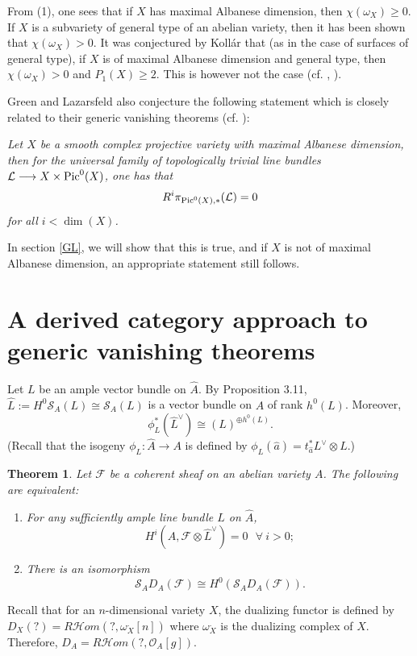 \documentclass[10pt]{amsart}
\newtheorem{thm}{Theorem}[section]
\newcommand\Pic{{\text{\rm Pic}}}
\newcommand\lra{\longrightarrow}
\newcommand\ot{{\otimes}}
\newcommand\OO{{\mathcal{O}}}
\newcommand\HH{{\mathcal{H}}}
\newcommand\PP{{\mathcal{L}}}
\newcommand\FF{{\mathcal{F}}}
\newcommand\s{{ {\mathcal S}}}
\begin{document}
From (1), one sees that if $X$ has maximal Albanese dimension, then
$\chi (\omega _X)\geq 0$. If $X$ is a subvariety of general type
of an abelian variety, then it has been shown that $\chi (\omega _X)>0$.
It was conjectured by Koll\'ar that 
(as in the case of surfaces of general type),
if $X$ is of  
maximal Albanese dimension and general type, then $\chi (\omega _X)>0$
and $P_1(X)\geq 2$. This is however not the case (cf. \cite{EL}, \cite{CH4}).

Green and Lazarsfeld also conjecture the following statement which is
closely related to their generic vanishing theorems (cf. \cite{GL}):

\bigskip {} {\em Let $X$ be a smooth complex projective
variety with maximal Albanese dimension, then for the universal family
of topologically trivial line bundles $\PP\lra X\times \Pic ^0(X)$,
one has that $$R^i\pi _{\Pic ^0(X),*}(\PP)=0$$
for all $i<\dim (X)$.}

In section \ref{GL}, 
we will show that this is true, and if $X$ is not of 
maximal Albanese dimension, an appropriate statement still follows.


\newpage
\section{\label{DC}A derived category approach to generic vanishing theorems}
Let $L$ be an ample vector bundle on $\hat{A}$. 
By \cite{Mu} Proposition 3.11, 
 $\hat {L}:=H^0\s _A(L)\cong  \s _A(L)$ is a vector bundle on $A$ of rank
 $h^0(L)$. Moreover,
 $$\phi _L^* \left( \hat{L}^\vee \right) 
\cong \left( L \right) ^{\oplus h^0(L)}.$$
(Recall that the isogeny $\phi _L:\hat {A}\lra A$ is defined by $\phi _L
(\hat {a})=t^*_{\hat {a}}L^\vee \ot L$.)

 \begin{thm} \label{TDC} \cite{Hac4}
 Let $\FF$ be a coherent sheaf on an abelian variety $A$.  
 The following are equivalent:
 \begin{enumerate}
 \item 
 For any sufficiently 
 ample line bundle
 $L$ on $\hat{A}$,  
 $$H^i(A, \FF \ot \hat {L}^\vee )=0\ \ \ \forall \ i>0;$$
 \item 
 There is an isomorphism
 $$\s _A D_A(\FF ) \cong H^0 \left( \s _A
 D_A(\FF )\right) .$$
 \end{enumerate}
 \end{thm}
Recall that for an $n$-dimensional variety $X$, 
the dualizing functor is defined by $D_X(?)=
R\HH om (?, \omega ^._X[n])$ where $\omega ^._X$ is the dualizing
complex of $X$. Therefore, $D_A= R\HH om (?, \OO _A[g])$.
\end{document}
